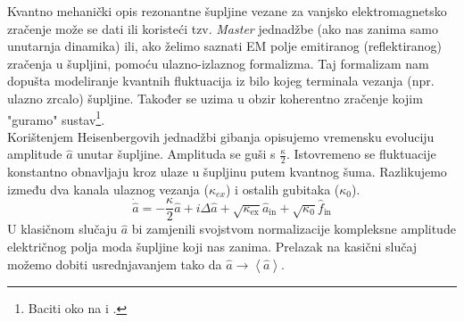 Kvantno mehanički opis rezonantne šupljine vezane za vanjsko elektromagnetsko zračenje može se dati ili koristeći tzv. \textit{Master} jednadžbe (ako nas
zanima samo unutarnja dinamika) ili, ako želimo saznati EM polje emitiranog (reflektiranog) zračenja u šupljini, pomoću ulazno-izlaznog formalizma. 
Taj formalizam nam dopušta modeliranje kvantnih fluktuacija iz bilo kojeg terminala vezanja (npr. ulazno zrcalo) šupljine. Također se uzima u obzir koherentno
zračenje kojim "guramo" sustav\footnote{Baciti oko na \cite{gardiner_zoller_2004} i \cite{clerk_devoret_girvin_marquardt_schoelkopf_2010}.}.\\
Korištenjem Heisenbergovih jednadžbi gibanja opisujemo vremensku evoluciju amplitude $\hat{a}$ unutar šupljine. Amplituda se guši s $\frac{\kappa}{2}$. Istovremeno
se fluktuacije konstantno obnavljaju kroz ulaze u šupljinu putem kvantnog šuma. Razlikujemo između dva kanala ulaznog vezanja ($\kappa_{ex}$) i ostalih gubitaka ($\kappa_0$).
\begin{equation}
\dot{\hat{a}}=-\frac{\kappa}{2} \hat{a}+i \Delta \hat{a}+\sqrt{\kappa_{\mathrm{ex}}} \hat{a}_{\mathrm{in}}+\sqrt{\kappa_0} \hat{f}_{\mathrm{in}}
\label{eq1}
\end{equation}
U klasičnom slučaju $\hat{a}$ bi zamjenili svojstvom normalizacije kompleksne amplitude električnog polja moda šupljine koji nas zanima. 
Prelazak na kasični slučaj možemo dobiti usrednjavanjem tako da $\hat{a} \rightarrow \left<\hat{a}\right>$.
